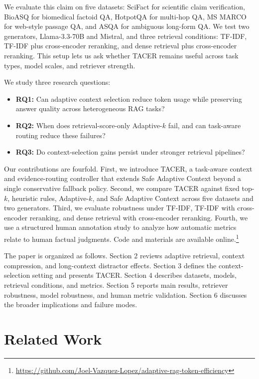 \documentclass[11pt]{article}
\begin{document}
We evaluate this claim on five datasets: SciFact for scientific claim verification, BioASQ for biomedical factoid QA, HotpotQA for multi-hop QA, MS MARCO for web-style passage QA, and ASQA for ambiguous long-form QA. We test two generators, Llama-3.3-70B and Mistral, and three retrieval conditions: TF-IDF, TF-IDF plus cross-encoder reranking, and dense retrieval plus cross-encoder reranking. This setup lets us ask whether TACER remains useful across task types, model scales, and retriever strength.

We study three research questions:
\begin{itemize}
\item \textbf{RQ1:} Can adaptive context selection reduce token usage while preserving answer quality across heterogeneous RAG tasks?
\item \textbf{RQ2:} When does retrieval-score-only Adaptive-$k$ fail, and can task-aware routing reduce these failures?
\item \textbf{RQ3:} Do context-selection gains persist under stronger retrieval pipelines?
\end{itemize}

Our contributions are fourfold. First, we introduce TACER, a task-aware context and evidence-routing controller that extends Safe Adaptive Context beyond a single conservative fallback policy. Second, we compare TACER against fixed top-$k$, heuristic rules, Adaptive-$k$, and Safe Adaptive Context across five datasets and two generators. Third, we evaluate robustness under TF-IDF, TF-IDF with cross-encoder reranking, and dense retrieval with cross-encoder reranking. Fourth, we use a structured human annotation study to analyze how automatic metrics relate to human factual judgments. Code and materials are available online.\footnote{\url{https://github.com/Joel-Vazquez-Lopez/adaptive-rag-token-efficiency}}

The paper is organized as follows. Section 2 reviews adaptive retrieval, context compression, and long-context distractor effects. Section 3 defines the context-selection setting and presents TACER. Section 4 describes datasets, models, retrieval conditions, and metrics. Section 5 reports main results, retriever robustness, model robustness, and human metric validation. Section 6 discusses the broader implications and failure modes.

\section{Related Work}
\end{document}
